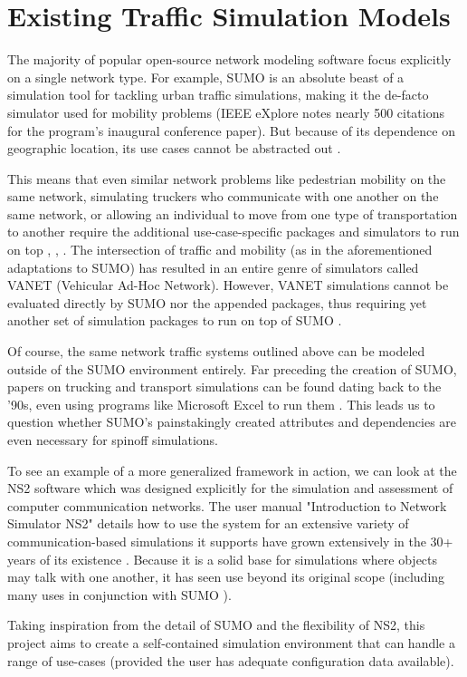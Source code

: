 \chapter{Existing Traffic Simulation Models}
\label{Related}

\par The majority of popular open-source network modeling software focus explicitly on a single network type.  For example, SUMO is an absolute beast of a simulation tool for tackling urban traffic simulations, making it the de-facto simulator used for mobility problems (IEEE eXplore notes nearly 500 citations for the program's inaugural conference paper).  But because of its dependence on geographic location, its use cases cannot be abstracted out \cite{LWB18}.  \\

\par This means that even similar network problems like pedestrian mobility on the same network, simulating truckers who communicate with one another on the same network, or allowing an individual to move from one type of transportation to another require the additional use-case-specific packages and simulators to run on top \cite{NAHRI2021469}, \cite{LWB18}, \cite{SKMR14}. The intersection of traffic and mobility (as in the aforementioned adaptations to SUMO) has resulted in an entire genre of simulators called VANET (Vehicular Ad-Hoc Network).  However, VANET simulations cannot be evaluated directly by SUMO nor the appended packages, thus requiring yet another set of simulation packages to run on top of SUMO \cite{LC08}.\\ 

\par Of course, the same network traffic systems outlined above can be modeled outside of the SUMO environment entirely.  Far preceding the creation of SUMO, papers on trucking and transport simulations can be found dating back to the '90s, even using programs like Microsoft Excel to run them \cite{Dag94}. This leads us to question whether SUMO's painstakingly created attributes and dependencies are even necessary for spinoff simulations. \\

\par To see an example of a more generalized framework in action, we can look at the NS2 software which was designed explicitly for the simulation and assessment of computer communication networks.  The user manual "Introduction to Network Simulator NS2" details how to use the system for an extensive variety of communication-based simulations it supports have grown extensively in the 30+ years of its existence \cite{IH11}.  Because it is a solid base for simulations where objects may talk with one another, it has seen use beyond its original scope (including many uses in conjunction with SUMO \cite{LWB18}). \\

\par Taking inspiration from the detail of SUMO and the flexibility of NS2, this project aims to create a self-contained simulation environment that can handle a range of use-cases (provided the user has adequate configuration data available).